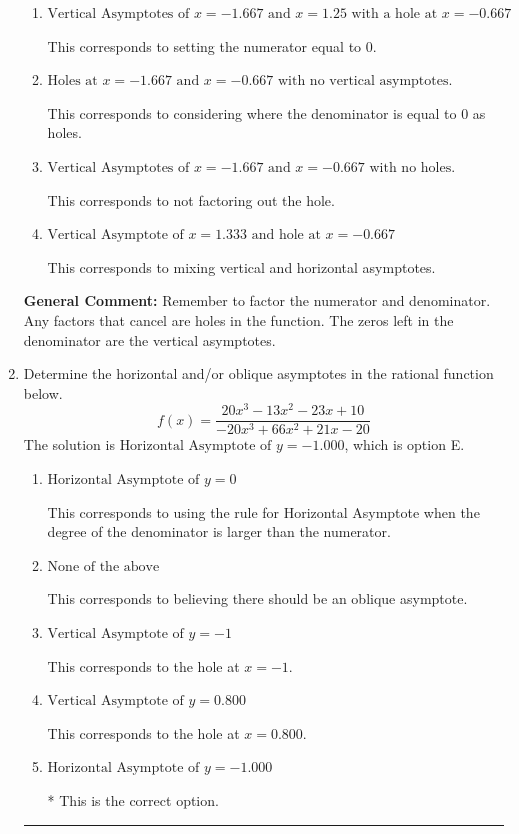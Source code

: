 \documentclass{extbook}[14pt]
\newcommand{\litem}[1]{\item #1

\rule{\textwidth}{0.4pt}}
\begin{document}
\begin{enumerate}
{\begin{enumerate}[label=\Alph*.]
This is the correct answer.
\item \( \text{Vertical Asymptotes of } x = -1.667 \text{ and } x = 1.25 \text{ with a hole at } x = -0.667 \)

This corresponds to setting the numerator equal to 0.
\item \( \text{Holes at } x = -1.667 \text{ and } x = -0.667 \text{ with no vertical asymptotes.} \)

This corresponds to considering where the denominator is equal to 0 as holes.
\item \( \text{Vertical Asymptotes of } x = -1.667 \text{ and } x = -0.667 \text{ with no holes.} \)

This corresponds to not factoring out the hole.
\item \( \text{Vertical Asymptote of } x = 1.333 \text{ and hole at } x = -0.667 \)

This corresponds to mixing vertical and horizontal asymptotes.
\end{enumerate}

\textbf{General Comment:} Remember to factor the numerator and denominator. Any factors that cancel are holes in the function. The zeros left in the denominator are the vertical asymptotes.
}
\litem{
Determine the horizontal and/or oblique asymptotes in the rational function below.
\[ f(x) = \frac{20x^{3} -13 x^{2} -23 x + 10}{-20x^{3} +66 x^{2} +21 x -20} \]The solution is \( \text{Horizontal Asymptote of } y = -1.000  \), which is option E.\begin{enumerate}[label=\Alph*.]
\item \( \text{Horizontal Asymptote of } y = 0  \)

This corresponds to using the rule for Horizontal Asymptote when the degree of the denominator is larger than the numerator.
\item \( \text{None of the above} \)

This corresponds to believing there should be an oblique asymptote.
\item \( \text{Vertical Asymptote of } y = -1  \)

This corresponds to the hole at $x = -1$.
\item \( \text{Vertical Asymptote of } y = 0.800  \)

This corresponds to the hole at $x = 0.800$.
\item \( \text{Horizontal Asymptote of } y = -1.000  \)

* This is the correct option.
\end{enumerate}

}
\end{enumerate}
\end{document}
